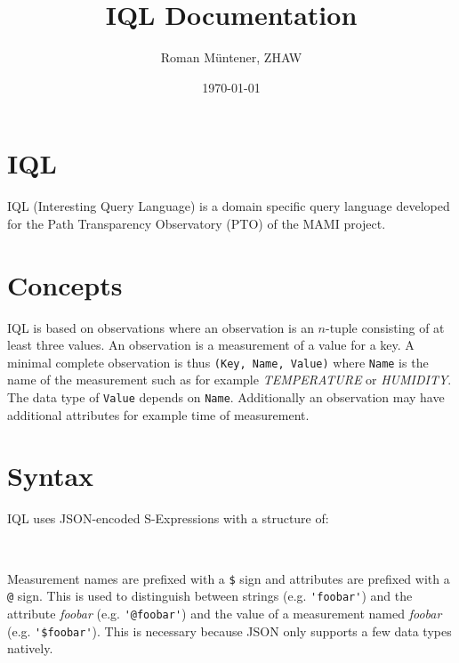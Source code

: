 \documentclass[a4paper]{article}
\begin{document}
\title{IQL Documentation}
\author{Roman M\"untener, ZHAW}
\date{\today}

\maketitle


\section{IQL}

IQL (Interesting Query Language) is a domain specific query language
developed for the Path Transparency Observatory (PTO) of the MAMI
project.

\section{Concepts}

IQL is based on observations where an observation is an $n$-tuple
consisting of at least three values. An observation is a measurement
of a value for a key.  A minimal complete observation is thus
\verb|(Key, Name, Value)| where \verb|Name| is the name of the
measurement such as for example \textit{TEMPERATURE} or
\textit{HUMIDITY}. The data type of \verb|Value| depends on
\verb|Name|. Additionally an observation may have additional
attributes for example time of measurement.

\section{Syntax}

IQL uses JSON-encoded S-Expressions with a structure of:

\begin{bnf*}
    {\bnfts{\{}  \bnfts{:} \bnfts{[}
       \bnfts{,} \bnfsk \bnfts{]} \bnfts{\}}}\\
    {  \bnfor {} }
\end{bnf*}

Measurement names are prefixed with a
\verb|$| sign and attributes are prefixed with a \verb|@| sign. This
is used to distinguish between strings (e.g. \verb|'foobar'|) and the
attribute \textit{foobar} (e.g. \verb|'@foobar'|) and the value of a
measurement named \textit{foobar} (e.g. \verb|'$foobar'|). This is
necessary because JSON only supports a few data types natively.
\end{document}
